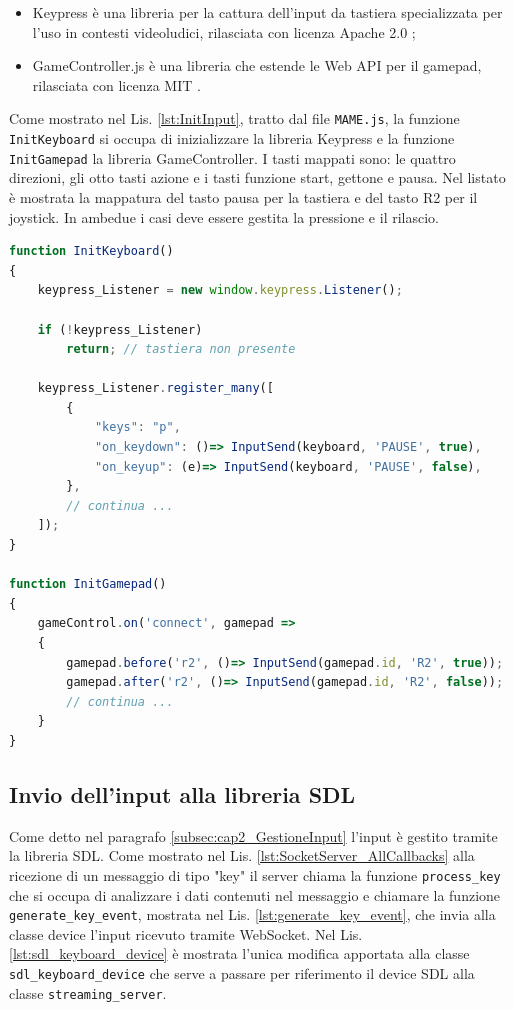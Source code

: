 \begin{itemize}
	\item Keypress è una libreria per la cattura dell'input da tastiera specializzata per l'uso in contesti videoludici, rilasciata con licenza Apache 2.0 \parencite{Keypress};
	\item GameController.js è una libreria che estende le Web API per il gamepad, rilasciata con licenza MIT \parencite{gameController_js}.
\end{itemize}

Come mostrato nel Lis. \ref{lst:InitInput}, tratto dal file \verb|MAME.js|, la funzione \verb|InitKeyboard| si occupa di inizializzare la libreria Keypress e la funzione \verb|InitGamepad| la libreria GameController. I tasti mappati sono: le quattro direzioni, gli otto tasti azione e i tasti funzione start, gettone e pausa. Nel listato è mostrata la mappatura del tasto pausa per la tastiera e del tasto R2 per il joystick. In ambedue i casi deve essere gestita la pressione e il rilascio.

\begin{lstlisting}[language=JavaScript, caption=Codice relativo alla gestione input lato client. File: \detokenize{Streaming/HTML/MAME.js}, label={lst:InitInput}]
function InitKeyboard()
{
	keypress_Listener = new window.keypress.Listener();

	if (!keypress_Listener)
		return; // tastiera non presente

	keypress_Listener.register_many([
		{
			"keys": "p",
			"on_keydown": ()=> InputSend(keyboard, 'PAUSE', true),
			"on_keyup": (e)=> InputSend(keyboard, 'PAUSE', false),
		},
		// continua ...
	]);
}

function InitGamepad()
{
	gameControl.on('connect', gamepad =>
	{
		gamepad.before('r2', ()=> InputSend(gamepad.id, 'R2', true));
		gamepad.after('r2', ()=> InputSend(gamepad.id, 'R2', false));
		// continua ...
	}
}
\end{lstlisting}
	
\subsection{Invio dell'input alla libreria SDL}
Come detto nel paragrafo \ref{subsec:cap2_GestioneInput} l'input è gestito tramite la libreria SDL. Come mostrato nel Lis. \ref{lst:SocketServer_AllCallbacks} alla ricezione di un messaggio di tipo "key" il server chiama la funzione \verb|process_key| che si occupa di analizzare i dati contenuti nel messaggio e chiamare la funzione \verb|generate_key_event|, mostrata nel Lis. \ref{lst:generate_key_event}, che invia alla classe device l'input ricevuto tramite WebSocket. Nel Lis. \ref{lst:sdl_keyboard_device} è mostrata l'unica modifica apportata alla classe \verb|sdl_keyboard_device| che serve a passare per riferimento il device SDL alla classe \verb|streaming_server|.


